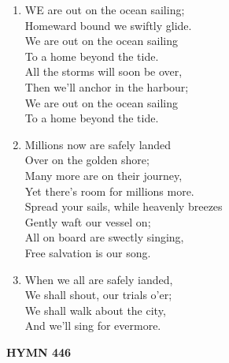 \documentclass[11pt,a4paper]{article}
\begin{document}
\begin{enumerate}
    \item WE are out on the ocean sailing; \\
        Homeward bound we swiftly glide. \\
        We are out on the ocean sailing \\
        To a home beyond the tide. \\
        All the storms will soon be over, \\
        Then we'll anchor in the harbour; \\
        We are out on the ocean sailing \\
        To a home beyond the tide.

    \item Millions now are safely landed \\
        Over on the golden shore; \\
        Many more are on their journey, \\
        Yet there's room for millions more. \\
        Spread your sails, while heavenly breezes \\
        Gently waft our vessel on; \\
        All on board are swectly singing, \\
        Free salvation is our song.

    \item When we all are safely ianded, \\
        We shall shout, our trials o'er; \\
        We shall walk about the city, \\
        And we'll sing for evermore.

\end{enumerate}

\newpage
\begin{center}
    {\Large \textbf{HYMN 446}}
\end{center}
\vspace{1em}
\end{document}
